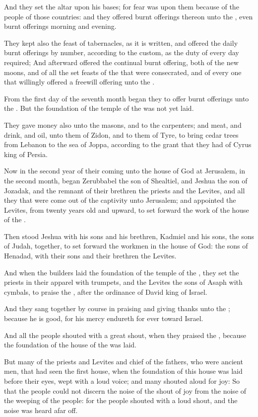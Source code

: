 \Verse And they set the altar upon his bases; for fear was upon them because of the people of those countries: and they offered burnt offerings thereon unto the \LORD, even burnt offerings morning and evening.

\Verse They kept also the feast of tabernacles, as it is written, and offered the daily burnt offerings by number, according to the custom, as the duty of every day required; \Verse And afterward offered the continual burnt offering, both of the new moons, and of all the set feasts of the \LORD that were consecrated, and of every one that willingly offered a freewill offering unto the \LORD.

\Verse From the first day of the seventh month began they to offer burnt offerings unto the \LORD. But the foundation of the temple of the \LORD was not yet laid.

\Verse They gave money also unto the masons, and to the carpenters; and meat, and drink, and oil, unto them of Zidon, and to them of Tyre, to bring cedar trees from Lebanon to the sea of Joppa, according to the grant that they had of Cyrus king of Persia.

\Verse Now in the second year of their coming unto the house of God at Jerusalem, in the second month, began Zerubbabel the son of Shealtiel, and Jeshua the son of Jozadak, and the remnant of their brethren the priests and the Levites, and all they that were come out of the captivity unto Jerusalem; and appointed the Levites, from twenty years old and upward, to set forward the work of the house of the \LORD.

\Verse Then stood Jeshua with his sons and his brethren, Kadmiel and his sons, the sons of Judah, together, to set forward the workmen in the house of God: the sons of Henadad, with their sons and their brethren the Levites.

\Verse And when the builders laid the foundation of the temple of the \LORD, they set the priests in their apparel with trumpets, and the Levites the sons of Asaph with cymbals, to praise the \LORD, after the ordinance of David king of Israel.

\Verse And they sang together by course in praising and giving thanks unto the \LORD; because he is good, for his mercy endureth for ever toward Israel.

And all the people shouted with a great shout, when they praised the \LORD, because the foundation of the house of the \LORD was laid.

\Verse But many of the priests and Levites and chief of the fathers, who were ancient men, that had seen the first house, when the foundation of this house was laid before their eyes, wept with a loud voice; and many shouted aloud for joy: \Verse So that the people could not discern the noise of the shout of joy from the noise of the weeping of the people: for the people shouted with a loud shout, and the noise was heard afar off.


